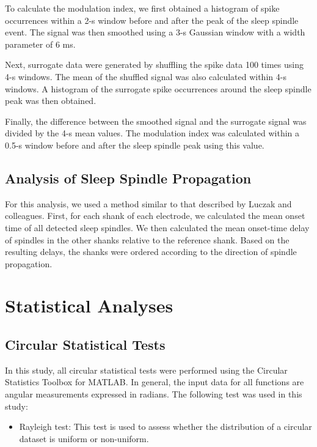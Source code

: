 \documentclass[12pt]{report}
\begin{document}
	To calculate the modulation index, we first obtained a histogram of spike occurrences within a 2-s window before and after the peak of the sleep spindle event. The signal was then smoothed using a 3-s Gaussian window with a width parameter of 6 ms.
	
	Next, surrogate data were generated by shuffling the spike data 100 times using 4-s windows. The mean of the shuffled signal was also calculated within 4-s windows. A histogram of the surrogate spike occurrences around the sleep spindle peak was then obtained.
	
	Finally, the difference between the smoothed signal and the surrogate signal was divided by the 4-s mean values. The modulation index was calculated within a 0.5-s window before and after the sleep spindle peak using this value.
	
	\subsection{Analysis of Sleep Spindle Propagation} 
	\label{Analysis of Sleep Spindle Propagation}
	For this analysis, we used a method similar to that described by Luczak and colleagues\cite{Luczak2007}. First, for each shank of each electrode, we calculated the mean onset time of all detected sleep spindles. We then calculated the mean onset-time delay of spindles in the other shanks relative to the reference shank. Based on the resulting delays, the shanks were ordered according to the direction of spindle propagation.
	\section{Statistical Analyses}
	\label{Statistical Analyses} 
	\subsection{Circular Statistical Tests}
	\label{Circular Statistical Tests} 
	
	In this study, all circular statistical tests were performed using the Circular Statistics Toolbox for MATLAB. In general, the input data for all functions are angular measurements expressed in radians. The following test was used in this study:
	
	\begin{itemize}
		\item Rayleigh test: This test is used to assess whether the distribution of a circular dataset is uniform or non-uniform.
	\end{itemize}
	
\end{document}
